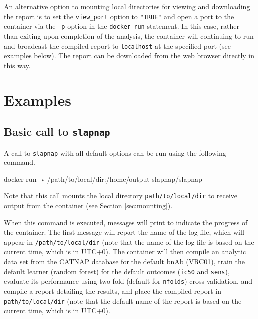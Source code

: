 \documentclass[]{article}
\newenvironment{Shaded}{\begin{snugshade}}{\end{snugshade}}
\newcommand{\ExtensionTok}[1]{#1}
\newcommand{\NormalTok}[1]{#1}
\begin{document}
An alternative option to mounting local directories for viewing and
downloading the report is to set the \texttt{view\_port} option to
\texttt{"TRUE"} and open a port to the container via the \texttt{-p}
option in the \texttt{docker\ run} statement. In this case, rather than
exiting upon completion of the analysis, the container will continuing
to run and broadcast the compiled report to \texttt{localhost} at the
specified port (see examples below). The report can be downloaded from
the web browser directly in this way.

\section{Examples}\label{sec:examples}

\subsection{\texorpdfstring{Basic call to
\texttt{slapnap}}{Basic call to slapnap}}\label{basic-call-to-slapnap}

A call to \texttt{slapnap} with all default options can be run using the
following command.

\begin{Shaded}
\begin{Highlighting}[]
\ExtensionTok{docker}\NormalTok{ run -v /path/to/local/dir:/home/output slapnap/slapnap}
\end{Highlighting}
\end{Shaded}

Note that this call mounts the local directory
\texttt{path/to/local/dir} to receive output from the container (see
Section \ref{sec:mounting}).

When this command is executed, messages will print to indicate the
progress of the container. The first message will report the name of the
log file, which will appear in \texttt{/path/to/local/dir} (note that
the name of the log file is based on the current time, which is in
UTC+0). The container will then compile an analytic data set from the
CATNAP database for the default bnAb (VRC01), train the default learner
(random forest) for the default outcomes (\texttt{ic50} and
\texttt{sens}), evaluate its performance using two-fold (default for
\texttt{nfolds}) cross validation, and compile a report detailing the
results, and place the compiled report in \texttt{path/to/local/dir}
(note that the default name of the report is based on the current time,
which is in UTC+0).
\end{document}
